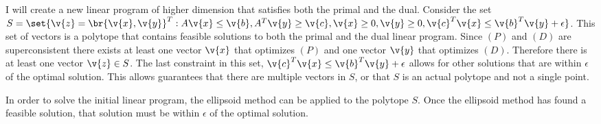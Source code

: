 \documentclass[11pt, oneside]{article}
\begin{document}
\begin{enumerate}
    I will create a new linear program of higher dimension that satisfies both the
    primal and the dual.
    Consider the set
    $S = \set{\v{z} = \br{\v{x}, \v{y}}^T : A\v{x} \le \v{b}, A^T\v{y} \ge \v{c}, \v{x} \ge 0, \v{y} \ge 0, \v{c}^T \v{x} \le \v{b}^T \v{y} + \epsilon}$.
    This set of vectors is a polytope that contains feasible solutions to both
    the primal and the dual linear program.
    Since $(P)$ and $(D)$ are superconsistent there exists at least one vector
    $\v{x}$ that optimizes $(P)$ and one vector $\v{y}$ that optimizes $(D)$.
    Therefore there is at least one vector $\v{z} \in S$.
    The last constraint in this set, $\v{c}^T \v{x} \le \v{b}^T \v{y} + \epsilon$
    allows for other solutions that are within $\epsilon$ of the optimal solution.
    This allows guarantees that there are multiple vectors in $S$, or that $S$ is
    an actual polytope and not a single point.

    In order to solve the initial linear program, the ellipsoid method can be
    applied to the polytope $S$.
    Once the ellipsoid method has found a feasible solution, that solution
    must be within $\epsilon$ of the optimal solution.
\end{enumerate}
\end{document}
